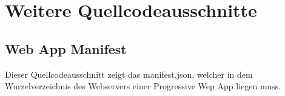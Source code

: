 \chapter{Weitere Quellcodeausschnitte}
\label{chap:weiterequellcodeausschnitte}

\section*{Web App Manifest}
\label{sec:webappmanifest}
Dieser Quellcodeausschnitt zeigt das manifest.json, welcher in dem Wurzelverzeichnis
des Webservers einer Progressive Wep App liegen muss.
\inputminted{jsx}{snippets/json/manifest.json}

